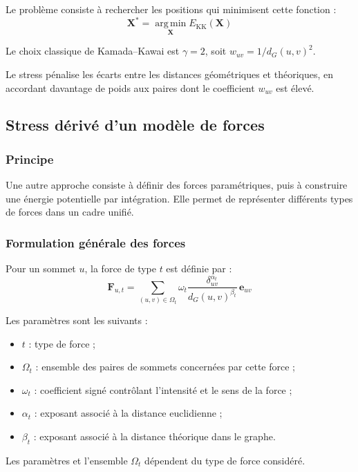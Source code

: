 \documentclass[a4paper,11pt]{article}
\begin{document}
Le problème consiste à rechercher les positions qui
minimisent cette fonction :
\[
\boxed{
\mathbf{X}^{*}
=
\operatorname*{arg\,min}_{\mathbf{X}}
E_{\mathrm{KK}}(\mathbf{X})
}
\]

Le choix classique de Kamada--Kawai est $\gamma=2$,
soit $w_{uv}=1/d_G(u,v)^2$.

Le stress pénalise les écarts entre les distances
géométriques et théoriques, en accordant davantage
de poids aux paires dont le coefficient $w_{uv}$ est élevé.

\subsection{Stress dérivé d'un modèle de forces}

\subsubsection{Principe}

Une autre approche consiste à définir des forces
paramétriques, puis à construire une énergie potentielle
par intégration. Elle permet de représenter différents
types de forces dans un cadre unifié.

\subsubsection{Formulation générale des forces}

Pour un sommet $u$, la force de type $t$ est définie par :
\[
\boxed{
\mathbf{F}_{u,t}
=
\sum_{(u,v)\in\Omega_t}
\omega_t
\frac{\delta_{uv}^{\alpha_t}}
{d_G(u,v)^{\beta_t}}
\,\mathbf{e}_{uv}
}
\]

Les paramètres sont les suivants :
\begin{itemize}
    \item $t$ : type de force ;
    \item $\Omega_t$ : ensemble des paires de sommets
    concernées par cette force ;
    \item $\omega_t$ : coefficient signé contrôlant
    l'intensité et le sens de la force ;
    \item $\alpha_t$ : exposant associé à la distance
    euclidienne ;
    \item $\beta_t$ : exposant associé à la distance
    théorique dans le graphe.
\end{itemize}

Les paramètres et l'ensemble $\Omega_t$ dépendent du
type de force considéré.
\end{document}
